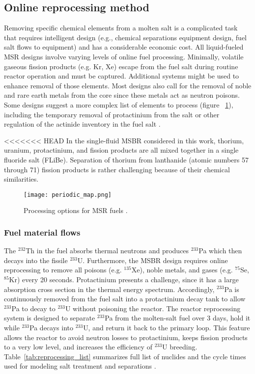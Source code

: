 \subsection{Online reprocessing method}
Removing specific chemical elements from a molten salt is a complicated task that requires intelligent design (e.g., chemical separations equipment design, fuel salt flows to equipment) and has a considerable economic cost. All liquid-fueled \gls{MSR} designs involve varying levels of online fuel processing. Minimally, volatile gaseous fission products (e.g. Kr, Xe) escape from the fuel salt during routine reactor operation and must be captured. Additional systems might be used to enhance removal of those elements. Most designs also call for the removal of noble and rare earth metals from the core since these metals act as neutron poisons. Some designs suggest a more complex list of elements to process (figure ~\ref{fig:periodic_tab}), including the temporary removal of protactinium from the salt or other regulation of the actinide inventory in the fuel salt \cite{ahmad_neutronics_2015}.

<<<<<<< HEAD
In the single-fluid \gls{MSBR} considered in this work, thorium, uranium, protactinium, and fission products are all mixed together in a single fluoride salt (FLiBe). Separation of thorium from lanthanide (atomic numbers 57 through 71) fission products is rather challenging because of their chemical similarities. 

\begin{figure}[htp!] %
  \centering
  \texttt{[image: periodic\_map.png]}
  \caption{Processing options for \gls{MSR} fuels \cite{ahmad_neutronics_2015}.}
  \label{fig:periodic_tab}
\end{figure}

\subsubsection{Fuel material flows}
The $^{232}$Th in the fuel absorbs thermal neutrons and produces $^{233}$Pa which then decays into the fissile $^{233}$U. Furthermore, the \gls{MSBR} design requires online reprocessing to remove all poisons (e.g. $^{135}$Xe), noble metals, and gases (e.g. $^{75}$Se, $^{85}$Kr) every 20 seconds. Protactinium presents a challenge, since it has a large absorption cross section in the thermal energy spectrum. Accordingly, $^{233}$Pa is continuously removed from the fuel salt into a protactinium decay tank to allow $^{233}$Pa to decay to $^{233}$U without poisoning the reactor. The reactor reprocessing system is designed to separate $^{233}$Pa from the molten-salt fuel over 3 days, hold it while $^{233}$Pa decays into $^{233}$U, and return it back to the primary loop. This feature allows the reactor to avoid neutron losses to protactinium, keeps fission products to a very low level, and increases the efficiency of $^{233}$U breeding. Table~\ref{tab:reprocessing_list} summarizes full list of nuclides and the cycle times used for modeling salt treatment and separations \cite{robertson_conceptual_1971}. 

